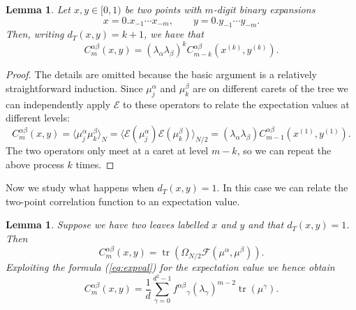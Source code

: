 \documentclass[11pt,oneside]{amsart}
\DeclareMathOperator{\tr}{tr}
\theoremstyle{plain}%
\newtheorem{lemma}[theorem]{Lemma}
\theoremstyle{definition}
\theoremstyle{remark}
\begin{document}
\begin{lemma}
	Let $x, y\in [0,1)$ be two points with $m$-digit binary expansions
	\begin{equation}
		x = 0.x_{-1}\cdots x_{-m}, \qquad y = 0.y_{-1}\cdots y_{-m}.
	\end{equation}
	 Then, writing $d_T(x,y) = k+1$, we have that
	\begin{equation}
		C^{\alpha\beta}_m(x,y) = (\lambda_{\alpha}\lambda_{\beta})^k C^{\alpha\beta}_{m-k}(x^{(k)},y^{(k)}).
	\end{equation}
\end{lemma}
\begin{proof}
	The details are omitted because the basic argument is a relatively straightforward induction. Since $\mu^\alpha_j$ and $\mu^\beta_k$ are on different carets of the tree we can independently apply $\mathcal{E}$ to these operators to relate the expectation values at different levels:
	\begin{equation}
		C^{\alpha\beta}_m(x,y) = \langle \mu^\alpha_j \mu^\beta_k\rangle_N = \langle \mathcal{E}(\mu^\alpha_j) \mathcal{E}(\mu^\beta_k)\rangle_{N/2} = (\lambda_{\alpha}\lambda_{\beta})C^{\alpha\beta}_{m-1}(x^{(1)},y^{(1)}).
	\end{equation}
	The two operators only meet at a caret at level $m-k$, so we can repeat the above process $k$ times.
\end{proof}

Now we study what happens when $d_T(x,y) = 1$. In this case we can relate the two-point correlation function to an expectation value.
\begin{lemma}
	Suppose we have two leaves labelled $x$ and $y$ and that $d_T(x,y) = 1$. Then
	\begin{equation}
		C^{\alpha\beta}_m(x,y) = \tr(\Omega_{N/2}\mathcal{F}(\mu^\alpha, \mu^\beta)).
	\end{equation}
	Exploiting the formula (\ref{eq:expval}) for the expectation value we hence obtain
	\begin{equation}
		C^{\alpha\beta}_m(x,y)  = \frac1d  \sum_{\gamma = 0}^{d^2-1} {f^{\alpha\beta}}_\gamma (\lambda_{\gamma})^{m-2} \tr(\mu^\gamma).
	\end{equation}
\end{lemma}
\end{document}
